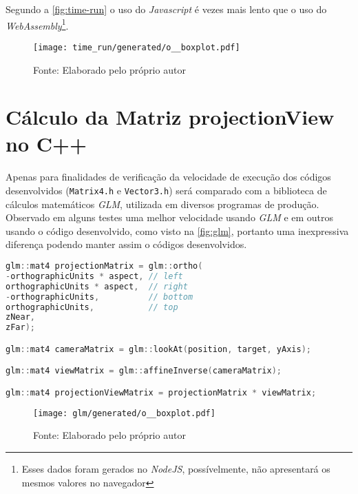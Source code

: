 \documentclass{article}
\begin{document}
Segundo a \autoref{fig:time-run} o uso do \textit{Javascript} é  vezes mais lento que o uso do \textit{WebAssembly}\footnote{Esses dados foram gerados no \textit{NodeJS}, possívelmente, não apresentará os mesmos valores no navegador}.

\begin{figure}[H]
    \centering
    
    \vspace{5pt}
    \texttt{[image: time\_run/generated/o\_\_boxplot.pdf]}
    \vspace{5pt}
    {\par\small Fonte: Elaborado pelo próprio autor}
    
    \label{fig:time-run}
\end{figure}

\section*{Cálculo da Matriz projectionView no C++}

Apenas para finalidades de verificação da velocidade de execução dos códigos desenvolvidos (\verb|Matrix4.h| e \verb|Vector3.h|) será comparado com a biblioteca de cálculos matemáticos \textit{GLM}, utilizada em diversos programas de produção. Observado em alguns testes uma melhor velocidade usando \textit{GLM} e em outros usando o código desenvolvido, como visto na \autoref{fig:glm}, portanto uma inexpressiva diferença podendo manter assim o códigos desenvolvidos.

\begin{lstlisting}[language=c,style=m_lststyle,label=lst:projectionViewGLM,caption=Cálculo da Matriz projectionView usando GLM]
glm::mat4 projectionMatrix = glm::ortho(
-orthographicUnits * aspect, // left
orthographicUnits * aspect,  // right
-orthographicUnits,          // bottom
orthographicUnits,           // top
zNear,
zFar);

glm::mat4 cameraMatrix = glm::lookAt(position, target, yAxis);

glm::mat4 viewMatrix = glm::affineInverse(cameraMatrix);

glm::mat4 projectionViewMatrix = projectionMatrix * viewMatrix;
\end{lstlisting}

\begin{figure}[H]
    \centering
    
    \vspace{5pt}
    \texttt{[image: glm/generated/o\_\_boxplot.pdf]}
    \vspace{5pt}
    {\par\small Fonte: Elaborado pelo próprio autor}
    
    \label{fig:glm}
\end{figure}



\end{document}
